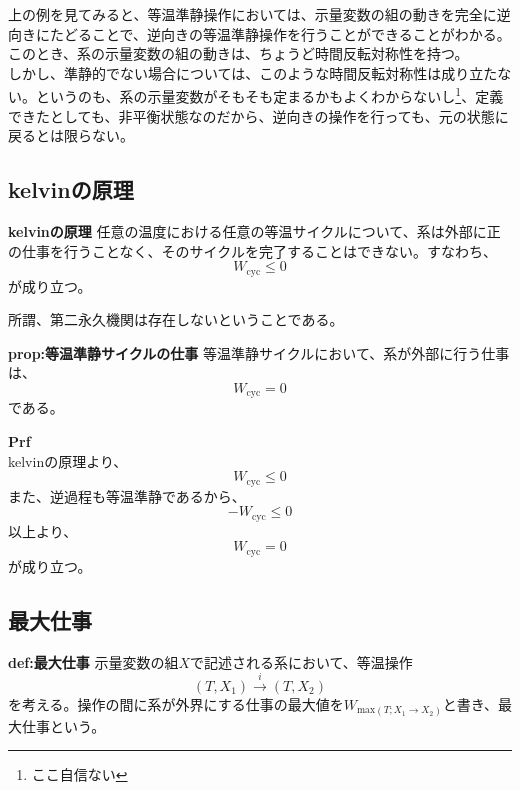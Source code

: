 \documentclass[a4paper,11pt]{jsarticle}
\begin{document}
上の例を見てみると、等温準静操作においては、示量変数の組の動きを完全に逆向きにたどることで、逆向きの等温準静操作を行うことができることがわかる。このとき、系の示量変数の組の動きは、ちょうど時間反転対称性を持つ。\\
しかし、準静的でない場合については、このような時間反転対称性は成り立たない。というのも、系の示量変数がそもそも定まるかもよくわからないし\footnote{ここ自信ない}、定義できたとしても、非平衡状態なのだから、逆向きの操作を行っても、元の状態に戻るとは限らない。

\subsection{kelvinの原理}
\begin{itembox}[l]{\textbf{kelvinの原理}}
    任意の温度における任意の等温サイクルについて、系は外部に正の仕事を行うことなく、そのサイクルを完了することはできない。すなわち、
    \begin{equation}
        W_{\text{cyc}} \leq 0
    \end{equation}
    が成り立つ。
\end{itembox}
所謂、第二永久機関は存在しないということである。\\

\begin{itembox}[l]{\textbf{prop:等温準静サイクルの仕事}}
    等温準静サイクルにおいて、系が外部に行う仕事は、
    \begin{equation}
        W_{\text{cyc}} = 0
    \end{equation}
    である。
\end{itembox}
\textbf{Prf}\\
kelvinの原理より、
\begin{equation}
    W_{\text{cyc}} \leq 0
\end{equation}
また、逆過程も等温準静であるから、
\begin{equation}
    -W_{\text{cyc}} \leq 0
\end{equation}
以上より、
\begin{equation}
    W_{\text{cyc}} = 0
\end{equation}
が成り立つ。\\

\subsection{最大仕事}
\begin{itembox}[l]{\textbf{def:最大仕事}}
    示量変数の組$X$で記述される系において、等温操作
    \begin{equation}
        (T,X_1) \xrightarrow{i} (T,X_2)
    \end{equation}
    を考える。操作の間に系が外界にする仕事の最大値を$W_{\text{max}(T;X_1\rightarrow X_2)}$と書き、最大仕事という。
\end{itembox}
\end{document}
